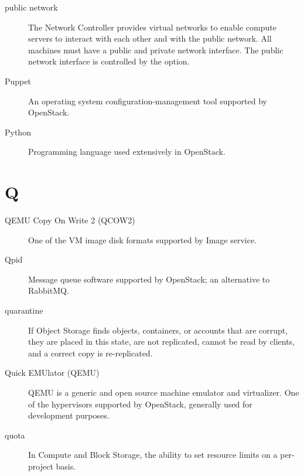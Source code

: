 \documentclass[letterpaper,10pt,english]{sphinxmanual}
\begin{document}
\begin{description}
\item[{public network}] \leavevmode{}\label{_source/glossary:term-public-network}
The Network Controller provides virtual networks to enable
compute servers to interact with each other and with the public
network. All machines must have a public and private network
interface. The public network interface is controlled by the
 option.

\item[{Puppet}] \leavevmode{}\label{_source/glossary:term-puppet}
An operating system configuration-management tool supported by
OpenStack.

\item[{Python}] \leavevmode{}\label{_source/glossary:term-python}
Programming language used extensively in OpenStack.

\end{description}


\section{Q}
\label{_source/glossary:q}\begin{description}
\item[{QEMU Copy On Write 2 (QCOW2)}] \leavevmode{}\label{_source/glossary:term-qemu-copy-on-write-2-qcow2}
One of the VM image disk formats supported by Image
service.

\item[{Qpid}] \leavevmode{}\label{_source/glossary:term-qpid}
Message queue software supported by OpenStack; an alternative to
RabbitMQ.

\item[{quarantine}] \leavevmode{}\label{_source/glossary:term-quarantine}
If Object Storage finds objects, containers, or accounts that
are corrupt, they are placed in this state, are not replicated, cannot
be read by clients, and a correct copy is re-replicated.

\item[{Quick EMUlator (QEMU)}] \leavevmode{}\label{_source/glossary:term-quick-emulator-qemu}
QEMU is a generic and open source machine emulator and
virtualizer.
One of the hypervisors supported by OpenStack, generally used
for development purposes.

\item[{quota}] \leavevmode{}\label{_source/glossary:term-quota}
In Compute and Block Storage, the ability to set resource limits
on a per-project basis.

\end{description}
\end{document}
